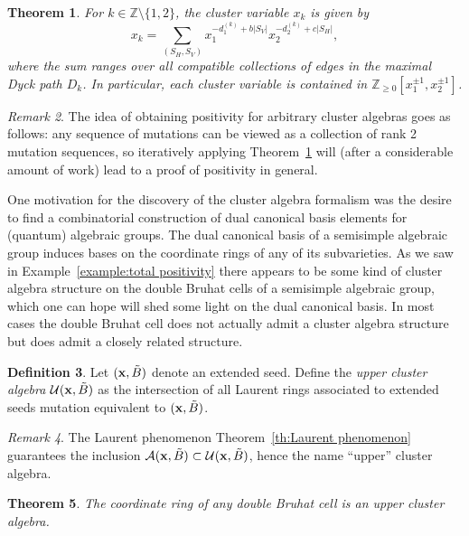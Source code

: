 \documentclass{amsart}
\newtheorem{theorem}{Theorem}[section]
\theoremstyle{definition}
\newtheorem{definition}[theorem]{Definition}
\theoremstyle{remark}
\newtheorem{remark}[theorem]{Remark}
\numberwithin{equation}{section}
\newcommand{\cA}{{\mathcal{A}}}
\newcommand{\cU}{{\mathcal{U}}}
\newcommand{\x}{{\bf x}}
\newcommand{\ZZ}{{\mathbb{Z}}}
\begin{document}
  \begin{theorem}\label{th:rank 2 positivity}\cite{LLZ14}
    For $k\in\ZZ\setminus\{1,2\}$, the cluster variable $x_k$ is given by
    \[x_k=\sum\limits_{(S_H,S_V)}x_1^{-d^{(k)}_1+b|S_V|}x_2^{-d^{(k)}_2+c|S_H|},\]
    where the sum ranges over all compatible collections of edges in the maximal Dyck path $D_k$.  In particular, each cluster variable is contained in $\ZZ_{\ge0}[x_1^{\pm1},x_2^{\pm1}]$.
  \end{theorem}

  \begin{remark}
    The idea of obtaining positivity for arbitrary cluster algebras goes as follows: any sequence of mutations can be viewed as a collection of rank 2 mutation sequences, so iteratively applying Theorem~\ref{th:rank 2 positivity} will (after a considerable amount of work) lead to a proof of positivity in general.
  \end{remark}

  One motivation for the discovery of the cluster algebra formalism was the desire to find a combinatorial construction of dual canonical basis elements for (quantum) algebraic groups.  The dual canonical basis of a semisimple algebraic group induces bases on the coordinate rings of any of its subvarieties.  As we saw in Example~\ref{example:total positivity} there appears to be some kind of cluster algebra structure on the double Bruhat cells of a semisimple algebraic group, which one can hope will shed some light on the dual canonical basis.  In most cases the double Bruhat cell does not actually admit a cluster algebra structure but does admit a closely related structure.

  \begin{definition}
    Let $(\x,\tilde B)$ denote an extended seed.  Define the \emph{upper cluster algebra} $\cU(\x,\tilde B)$ as the intersection of all Laurent rings associated to extended seeds mutation equivalent to $(\x,\tilde B)$.
  \end{definition}

  \begin{remark}
    The Laurent phenomenon Theorem~\ref{th:Laurent phenomenon} guarantees the inclusion $\cA(\x,\tilde B)\subset\cU(\x,\tilde B)$, hence the name ``upper'' cluster algebra.
  \end{remark}

  \begin{theorem}
    The coordinate ring of any double Bruhat cell is an upper cluster algebra.
  \end{theorem}
\end{document}

